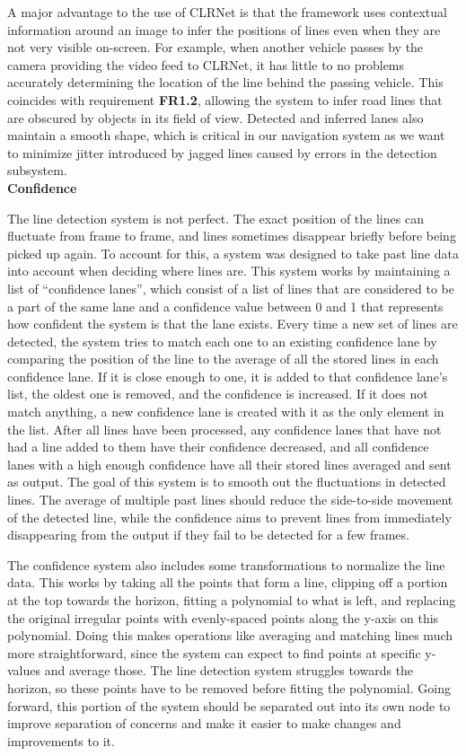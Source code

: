 \documentclass[titlepage, draft]{article}
\begin{document}
{A major advantage to the use of CLRNet is that the framework uses contextual information around an image to infer the positions
of lines even when they are not very visible on-screen.
For example, when another vehicle passes by the camera providing the video feed to CLRNet, it has little to no problems
accurately determining the location of the line behind the passing vehicle.
This coincides with requirement \textbf{FR1.2}, allowing the system to infer road lines that are obscured by objects in its field
of view.
Detected and inferred lanes also maintain a smooth shape, which is critical in our navigation system as we want to minimize
jitter introduced by jagged lines caused by errors in the detection subsystem.
\\

\textbf{Confidence}

The line detection system is not perfect. The exact position of the lines can fluctuate from frame to frame, and lines sometimes disappear briefly before being picked up again. To account for this, a system was designed to take past line data into account when deciding where lines are. This system works by maintaining a list of ``confidence lanes'', which consist of a list of lines that are considered to be a part of the same lane and a confidence value between 0 and 1 that represents how confident the system is that the lane exists. Every time a new set of lines are detected, the system tries to match each one to an existing confidence lane by comparing the position of the line to the average of all the stored lines in each confidence lane. If it is close enough to one, it is added to that confidence lane's list, the oldest one is removed, and the confidence is increased. If it does not match anything, a new confidence lane is created with it as the only element in the list. After all lines have been processed, any confidence lanes that have not had a line added to them have their confidence decreased, and all confidence lanes with a high enough confidence have all their stored lines averaged and sent as output. The goal of this system is to smooth out the fluctuations in detected lines. The average of multiple past lines should reduce the side-to-side movement of the detected line, while the confidence aims to prevent lines from immediately disappearing from the output if they fail to be detected for a few frames.

The confidence system also includes some transformations to normalize the line data. This works by taking all the points that form a line, clipping off a portion at the top towards the horizon, fitting a polynomial to what is left, and replacing the original irregular points with evenly-spaced points along the y-axis on this polynomial. Doing this makes operations like averaging and matching lines much more straightforward, since the system can expect to find points at specific y-values and average those. The line detection system struggles towards the horizon, so these points have to be removed before fitting the polynomial. Going forward, this portion of the system should be separated out into its own node to improve separation of concerns and make it easier to make changes and improvements to it.

}
\end{document}
